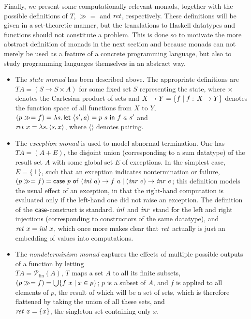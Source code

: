 Finally, we present some computationally relevant monads, together with the
possible definitions of $T$, $\gg=$ and $\mathit{ret}$, respectively. These definitions
will be given in a set-theoretic manner, but the translations to Haskell
datatypes and functions should not constitute a problem. This is done so to
motivate the more abstract definition of monads in the next section and because
monads can not merely be used as a feature of a concrete programming language,
but also to study programming languages themselves in an abstract way.
\begin{itemize}
\item The \emph{state monad} has been described above. The appropriate
  definitions are\\
  $T A = (S \to S \times A)$ for some fixed set $S$ representing the state, where $\times$
  denotes the Cartesian product of sets and $X \to Y = \{f\;|\; f :\, X \to Y\}$
  denotes the function space of all functions from $X$ to $Y$,\\
  $(p \gg= f) = {\lambda s.\,\mathsf{let}\ \langle s', a\rangle = p\ s\ \mathsf{in}\ f\ a\ s'}$ and\\
  $\mathit{ret}~x = {\lambda s.\,\langle s, x\rangle}$, where $\langle\rangle$ denotes pairing.

\item The \emph{exception monad} is used to model abnormal termination. One
  has\\
  $T A = (A + E)$, \IE the disjoint union (corresponding to a sum datatype) of
  the result set $A$ with some global set $E$ of exceptions. In the simplest
  case, $E = \{\bot\}$, such that an exception
  indicates nontermination or failure,\\
  $(p \gg= f) = \Case\ p\ \Of\ (\inl\ a) \to f\ a \Alt (\inr\ e) \to \inr\ e$; this
  definition models the usual effect of an exception, in that the right-hand
  computation is evaluated only if the left-hand one did not raise an
  exception. The definition of the $\mathsf{case}$-construct is standard. $\mathit{inl}$ and
  $\mathit{inr}$ stand for the left and right injections (corresponding to
  constructors of the same datatype), and\\
  $\mathit{ret}~x = \mathit{inl}\ x$, which once more makes clear that $\mathit{ret}$ actually is just an
  embedding of values into computations.

\item The \emph{nondeterminism monad} captures the effects of multiple possible
  outputs of a function by letting\\
  $T A = \mathcal{P}_{\mathrm{fin}}(A)$, \IE $T$ maps a set $A$ to all its finite
  subsets,\\
  $(p \gg= f) = \bigcup\{f\ x \;|\; x \in p\}$; $p$ is a subset of $A$, and $f$ is applied to
  all elements of $p$, the result of which will be a set of sets, which is
  therefore flattened by taking the union of all these sets, and\\
  $\mathit{ret}~x = \{x\}$, \IE the singleton set containing only $x$.


\end{itemize}
